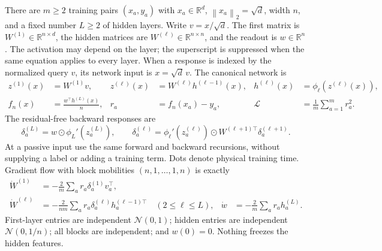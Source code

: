 \documentclass[11pt]{article}
\theoremstyle{definition}
\theoremstyle{remark}
\newcommand{\R}{\mathbb R}
\newcommand{\cL}{\mathcal L}
\newcommand{\norm}[1]{\left\lVert#1\right\rVert}
\newcommand{\od}{\mathbin{\odot}}
\begin{document}
There are $m\ge2$ training pairs $(x_a,y_a)$ with
$x_a\in\R^d$, $\norm{x_a}_2=\sqrt d$, width $n$, and a fixed number
$L\ge2$ of hidden layers. Write $v=x/\sqrt d$. The first matrix is
$W^{(1)}\in\R^{n\times d}$, the hidden matrices are
$W^{(\ell)}\in\R^{n\times n}$, and the readout is $w\in\R^n$.
The activation may depend on the layer; the superscript is suppressed when
the same equation applies to every layer. When a response is indexed by
the normalized query $v$, its network input is $x=\sqrt d\,v$.
The canonical network is
\begin{align}
 z^{(1)}(x)&=W^{(1)}v,&
 z^{(\ell)}(x)&=W^{(\ell)}h^{(\ell-1)}(x),&
 h^{(\ell)}(x)&=\phi_\ell(z^{(\ell)}(x)),\nonumber\\
 f_n(x)&=\frac{w^\top h^{(L)}(x)}n,&
 r_a&=f_n(x_a)-y_a,&
 \cL&=\frac1m\sum_{a=1}^m r_a^2.
 \label{cp:network}
\end{align}
The residual-free backward responses are
\begin{equation}
 \delta_a^{(L)}=w\od\phi_L'(z_a^{(L)}),\qquad
 \delta_a^{(\ell)}=\phi_\ell'(z_a^{(\ell)})\od
                W^{(\ell+1)\top}\delta_a^{(\ell+1)}.
 \label{cp:backward}
\end{equation}
At a passive input use the same forward and backward recursions, without
supplying a label or adding a training term.
Dots denote physical training time. Gradient flow with block mobilities
$(n,1,\ldots,1,n)$ is exactly
\begin{align}
 \dot W^{(1)}&=-\frac2m\sum_a r_a\delta_a^{(1)}v_a^\top,
 \nonumber\\
 \dot W^{(\ell)}&=-\frac2{nm}\sum_a
          r_a\delta_a^{(\ell)}h_a^{(\ell-1)\top}\quad(2\le\ell\le L),
 &\dot w&=-\frac2m\sum_a r_a h_a^{(L)}.
 \label{cp:flow}
\end{align}
First-layer entries are independent $\mathcal N(0,1)$; hidden entries are
independent $\mathcal N(0,1/n)$; all blocks are independent; and $w(0)=0$.
Nothing freezes the hidden features.
\end{document}
